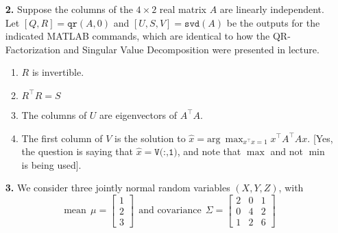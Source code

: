 \documentclass[letterpaper]{article}
\newcommand{\Covof}[2]{ \mathrm{cov} \left(#1,#2\right)}
\begin{document}
\begin{enumerate}


\item[{\bf 2.}]  Suppose the columns of the $4 \times 2$ real matrix $A$  are linearly independent. Let $[Q,R]=\texttt{qr}(A,0)$ and $[U,S,V]=\texttt{svd}(A)$ be the outputs for the indicated MATLAB commands, which are identical to how the QR-Factorization and Singular Value Decomposition were presented in lecture.
\begin{enumerate}
\setlength{\itemsep}{.15in}
\renewcommand{\labelenumi}{(\alph{enumi})}
\setlength{\itemsep}{.1in}
\item $R$ is invertible.
\item $R^\top R=S$
\item The columns of $U$ are eigenvectors of $A^\top A$.
    \item The first column of $V$ is the solution to $\widehat{x} = \text{arg}~\max_{x^\top x=1} x^\top A^\top A x.$ [Yes, the question is saying that $\widehat{x}=\texttt{V(:,1)}$, and note that $\max$ and not  $\min$ is being used].
\end{enumerate}

\item[{\bf 3.}]  We consider three jointly normal random variables $(X,Y,Z)$, with
$$ \mbox{mean}~~\mu = \left[\begin{array}{r} 1\\  2\\  3\end{array} \right] ~~\mbox{and covariance}~~ \Sigma = \left[  \begin{array}{rrr}  2&   0&   1\\  0&   4&   2\\  1&   2&   6\end{array}
\right] $$


\end{enumerate}
\end{document}
